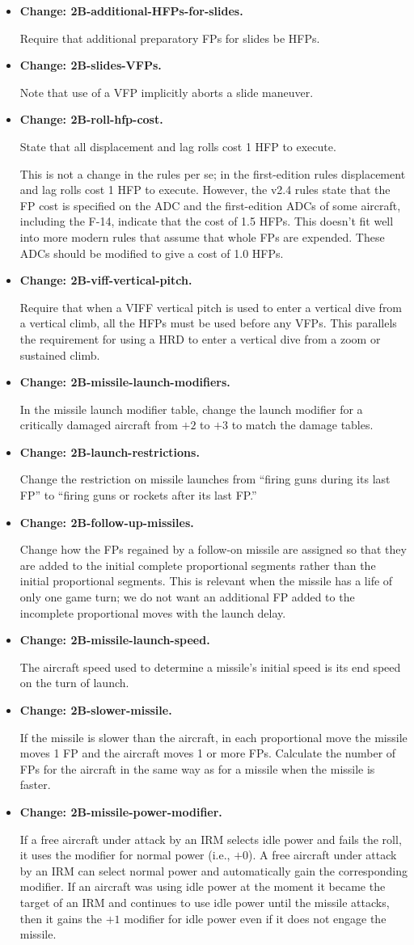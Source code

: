\documentclass[10pt]{report}
\newcommand{\itemtag}[1]{\item \textbf{Change: #1.}\par}
\begin{document}
\begin{itemize}
    \itemtag{2B-additional-HFPs-for-slides} Require that additional preparatory FPs for slides be HFPs.
    
    \itemtag{2B-slides-VFPs} Note that use of a VFP implicitly aborts a slide maneuver.

    \itemtag{2B-roll-hfp-cost} State that all displacement and lag rolls cost 1 HFP to execute.

    This is not a change in the rules per se; in the first-edition rules displacement and lag rolls cost 1 HFP to execute. However, the v2.4 rules state that the FP cost is specified on the ADC and the first-edition ADCs of some aircraft, including the F-14, indicate that the cost of 1.5 HFPs. This doesn't fit well into more modern rules that assume that whole FPs are expended. These ADCs should be modified to give a cost of 1.0 HFPs.
    
    \itemtag{2B-viff-vertical-pitch} Require that when a VIFF vertical pitch is used to enter a vertical dive from a vertical climb, all the HFPs must be used before any VFPs. This parallels the requirement for using a HRD to enter a vertical dive from a zoom or sustained climb.

    \itemtag{2B-missile-launch-modifiers} In the missile launch modifier table, change the launch modifier for a critically damaged aircraft from $+2$ to $+3$ to match the damage tables.
    
    \itemtag{2B-launch-restrictions} Change the restriction on missile launches from “firing guns during its last FP” to “firing guns or rockets after its last FP.”

    \itemtag{2B-follow-up-missiles} Change how the FPs regained by a follow-on missile are assigned so that they are added to the initial complete proportional segments rather than the initial proportional segments. This is relevant when the missile has a life of only one game turn; we do not want an additional FP added to the incomplete proportional moves with the launch delay.
    
    \itemtag{2B-missile-launch-speed} The aircraft speed used to determine a missile's initial speed is its end speed on the turn of launch.
    
    \itemtag{2B-slower-missile} If the missile is slower than the aircraft, in each proportional move the missile moves 1 FP and the aircraft moves 1 or more FPs. Calculate the number of FPs for the aircraft in the same way as for a missile when the missile is faster.
    
    \itemtag{2B-missile-power-modifier} If a free aircraft under attack by an IRM selects idle power and fails the roll, it uses the modifier for normal power (i.e., $+0$). A free aircraft under attack by an IRM can select normal power and automatically gain the corresponding modifier. If an aircraft was using idle power at the moment it became the target of an IRM and continues to use idle power until the missile attacks, then it gains the $+1$ modifier for idle power even if it does not engage the missile.
    

\end{itemize}
\end{document}

